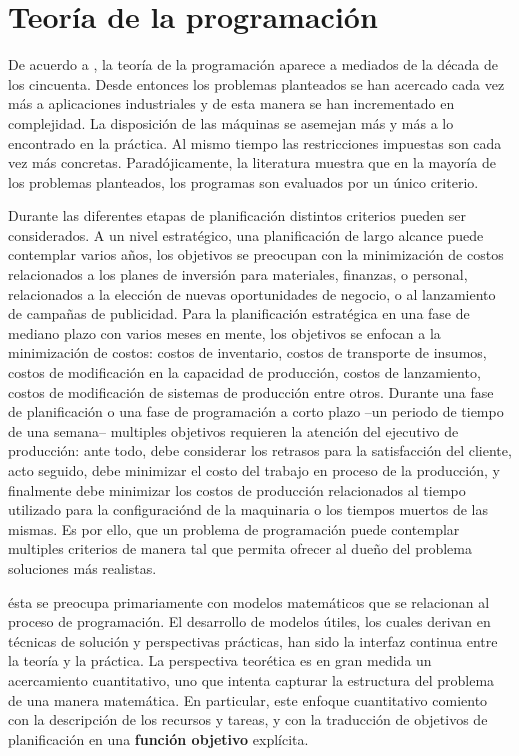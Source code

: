 \documentclass[draft,12pt,headsepline,footsepline,paper=letter]{scrreprt}
\begin{document}
\section{Teoría de la programación}
\label{teoria_programacion}

De acuerdo a \citet[p.~1]{TKindt2002}, la teoría de la programación aparece a mediados de la década de los cincuenta. Desde entonces los problemas planteados se han acercado cada vez más a aplicaciones industriales y de esta manera se han incrementado en complejidad. La disposición de las máquinas se asemejan más y más a lo encontrado en la práctica. Al mismo tiempo las restricciones impuestas son cada vez más concretas.  Paradójicamente, la literatura muestra que en la mayoría de los problemas planteados, los programas son evaluados por un único criterio. 

Durante las diferentes etapas de planificación distintos criterios pueden ser considerados. A un nivel estratégico, una planificación de largo alcance puede contemplar varios años, los objetivos se preocupan con la minimización de costos relacionados a los planes de inversión para materiales, finanzas, o personal, relacionados a la elección de nuevas oportunidades de negocio, o al lanzamiento de campañas de publicidad. Para la planificación estratégica en una fase de mediano plazo con varios meses en mente, los objetivos se enfocan a la minimización de costos: costos de inventario, costos de transporte de insumos, costos de modificación en la capacidad de producción, costos de lanzamiento, costos de modificación de sistemas de producción entre otros. Durante una fase de planificación o una fase de programación a corto plazo –un periodo de tiempo de una semana– multiples objetivos requieren la atención del ejecutivo de producción: ante todo, debe considerar los retrasos para la satisfacción del cliente, acto seguido, debe minimizar el costo del trabajo en proceso de la producción, y finalmente debe minimizar los costos de producción relacionados al tiempo utilizado para la configuraciónd de la maquinaria o los tiempos muertos de las mismas. Es por ello, que un problema de programación puede contemplar multiples criterios de manera tal que permita ofrecer al dueño del problema soluciones más realistas\citep[p.~1]{TKindt2002}.

ésta se preocupa primariamente con modelos matemáticos que se relacionan al proceso de programación. El desarrollo de modelos útiles, los cuales derivan en técnicas de solución y perspectivas prácticas, han sido la interfaz continua entre la teoría y la práctica. 
%
La perspectiva teorética es en gran medida un acercamiento cuantitativo, uno que intenta capturar la estructura del problema de una manera matemática.
%
En particular, este enfoque cuantitativo comiento con la descripción de los recursos y tareas, y con la traducción de objetivos de planificación en una \textbf{función objetivo} explícita.
\end{document}
